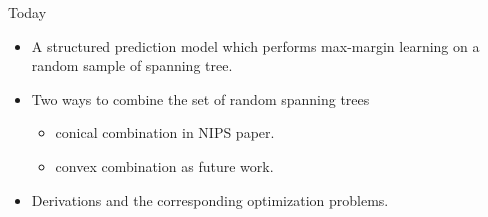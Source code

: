 \documentclass[first=dgreen,second=purple,logo=yellowexc]{aaltoslides}
\begin{document}
%
\begin{frame}{Today}
	\begin{itemize}\footnotesize
		\item A structured prediction model which performs max-margin learning on a random sample of spanning tree.
		\item Two ways to combine the set of random spanning trees
		\begin{itemize}\footnotesize
			\item conical combination in NIPS paper.
			\item convex combination as future work.
		\end{itemize}
		\item Derivations and the corresponding optimization problems.
	\end{itemize}
\end{frame}
\end{document}
